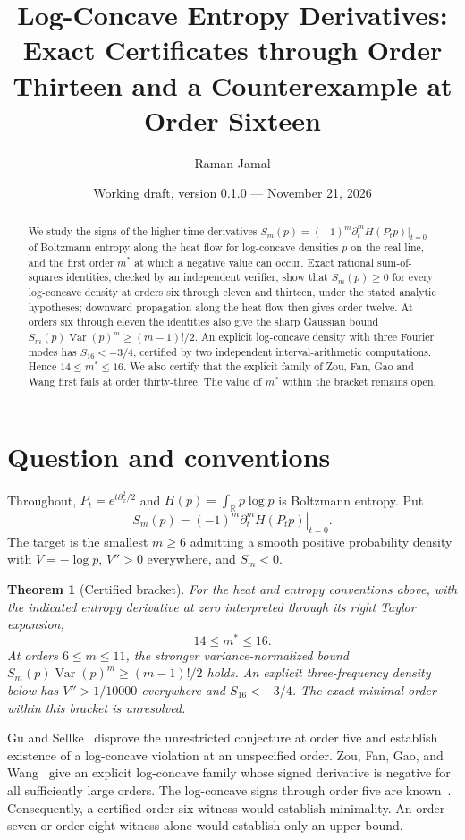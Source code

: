 \documentclass[11pt]{article}
\title{Log-Concave Entropy Derivatives: Exact Certificates through Order Thirteen and a Counterexample at Order Sixteen}
\author{Raman Jamal}
\date{Working draft, version 0.1.0 --- November 21, 2026}
\newtheorem{theorem}{Theorem}
\begin{document}
\maketitle
\begin{abstract}
We study the signs of the higher time-derivatives
$S_m(p)=(-1)^m\partial_t^mH(P_tp)|_{t=0}$ of Boltzmann entropy along the heat
flow for log-concave densities $p$ on the real line, and the first order $m^*$
at which a negative value can occur. Exact rational sum-of-squares identities,
checked by an independent verifier, show that $S_m(p)\ge0$ for every
log-concave density at orders six through eleven and thirteen, under the stated
analytic hypotheses; downward propagation along the heat flow then gives order
twelve. At orders six through eleven the identities also give the sharp
Gaussian bound $S_m(p)\operatorname{Var}(p)^m\ge(m-1)!/2$. An explicit
log-concave density with three Fourier modes has $S_{16}<-3/4$, certified by
two independent interval-arithmetic computations. Hence $14\le m^*\le16$. We
also certify that the explicit family of Zou, Fan, Gao and Wang first fails at
order thirty-three. The value of $m^*$ within the bracket remains open.
\end{abstract}
\section{Question and conventions}
Throughout, $P_t=e^{t\partial_x^2/2}$ and
$H(p)=\int_{\mathbb R}p\log p$ is Boltzmann entropy. Put
\[S_m(p)=(-1)^m\left.\partial_t^mH(P_tp)\right|_{t=0}.\]
The target is the smallest $m\ge6$ admitting a smooth positive probability
density with $V=-\log p$, $V''>0$ everywhere, and $S_m<0$.
\begin{theorem}[Certified bracket]
For the heat and entropy conventions above, with the indicated entropy
derivative at zero interpreted through its right Taylor expansion,
\[
 14\le m^*\le16.
\]
At orders $6\le m\le11$, the stronger variance-normalized bound
$S_m(p)\operatorname{Var}(p)^m\ge(m-1)!/2$ holds.
An explicit three-frequency density below has $V''>1/10000$ everywhere
and $S_{16}<-3/4$. The exact minimal order within this bracket is unresolved.
\end{theorem}

Gu and Sellke~\cite{gu} disprove the unrestricted conjecture at order five
and establish existence of a log-concave violation at an unspecified order.
Zou, Fan, Gao, and Wang~\cite{zou} give an explicit log-concave family whose
signed derivative is negative for all sufficiently large orders.
The log-concave signs through order five are known~\cite{wang}.
Consequently, a certified order-six witness would establish minimality.
An order-seven or order-eight witness alone would establish only an upper bound.
\end{document}
